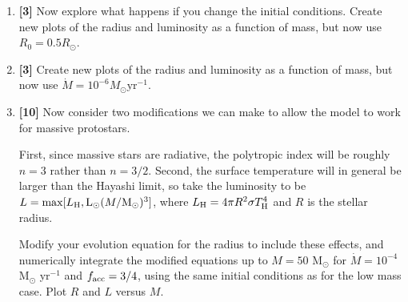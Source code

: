 \documentclass{article}
\newcommand{\msun}{\ensuremath{\mathrm{M}_\odot}\xspace}
\newcommand{\lsun}{\ensuremath{\mathrm{L}_\odot}\xspace}
\begin{document}
\begin{enumerate}
\begin{enumerate}
    Plot the radius and luminosity as
    a function of mass; in the luminosity, include both the the accretion
    luminosity and the internal luminosity produced by the star.
\item \textbf{[3]} Now explore what happens if you change the initial conditions.
    Create new plots of the radius and luminosity as a function of mass, but now
    use $R_0=0.5 R_\odot$. 
\item \textbf{[3]} 
    Create new plots of the radius and luminosity as a function of mass, but now
    use $\dot{M}=10^{-6} M_\odot \mathrm{yr}^{-1}$. 
\item \textbf{[10]} Now consider two modifications we can make to allow the model to work
for massive protostars.

First, since massive stars are radiative, the
polytropic index will be roughly $n=3$ rather than $n=3/2$. Second, the
surface temperature will in general be larger than the Hayashi limit, so take
the luminosity to be $L=\max[L_{\rm H}, \lsun(M/\msun)^3]$, where $L_{\rm
H}=4\pi R^2 \sigma T_{\rm H}^4$ and $R$ is the stellar radius.

Modify your
evolution equation for the radius to include these effects, and numerically
integrate the modified equations up to $M=50$ $\msun$ for $\dot{M} = 10^{-4}$
$\msun$ yr$^{-1}$ and $f_{\rm acc}=3/4$, using the same initial conditions as
for the low mass case. Plot $R$ and $L$ versus $M$.
\end{enumerate}



% 


\end{enumerate}
\end{document}
